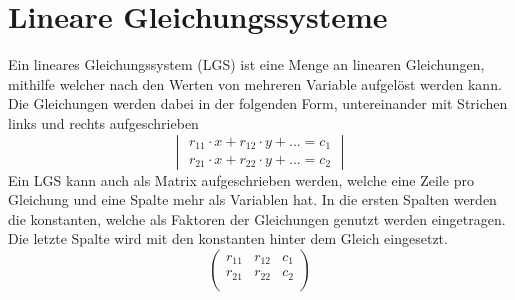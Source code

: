 \documentclass{article}
\begin{document}
 
\section{Lineare Gleichungssysteme}
Ein lineares Gleichungssystem (LGS) ist eine Menge an linearen Gleichungen, mithilfe welcher nach den Werten von mehreren Variable aufgelöst werden kann. Die Gleichungen werden dabei in der folgenden Form, untereinander mit Strichen links und rechts aufgeschrieben
\[
\begin{vmatrix}
 r_{11} \cdot x + r_{12} \cdot y + ... = c_1 \\
 r_{21} \cdot x + r_{22} \cdot y + ... = c_2 
\end{vmatrix}
\] 
Ein LGS kann auch als Matrix aufgeschrieben werden, welche eine Zeile pro Gleichung und eine Spalte mehr als Variablen hat. In die ersten Spalten werden die konstanten, welche als Faktoren der Gleichungen genutzt werden eingetragen. Die letzte Spalte wird mit den konstanten hinter dem Gleich eingesetzt.
\[
\begin{pmatrix}
 r_{11} & r_{12} & c_1 \\
 r_{21} & r_{22} & c_2 \\
\end{pmatrix}
\] 
 
\end{document}
